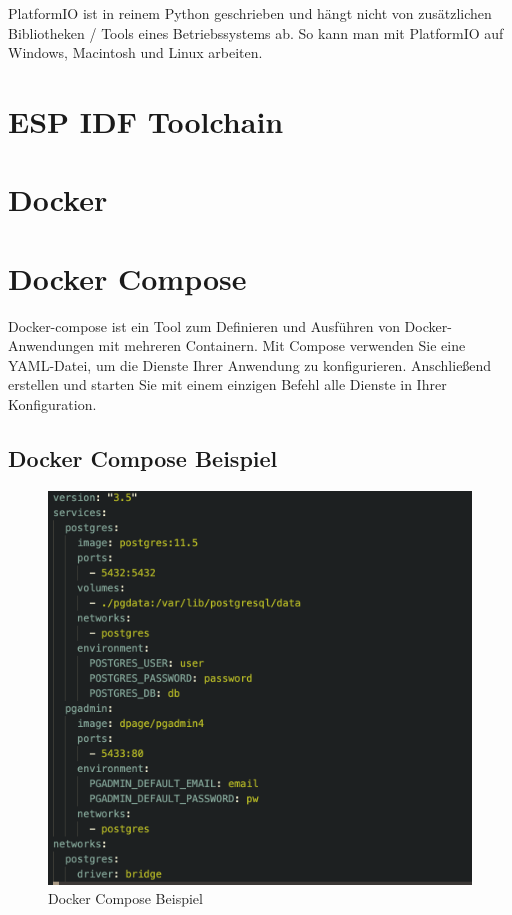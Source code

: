 PlatformIO ist in reinem Python geschrieben und hängt nicht von zusätzlichen Bibliotheken / Tools eines Betriebssystems ab. So kann man mit PlatformIO auf Windows, Macintosh und Linux arbeiten.

\section{ESP IDF Toolchain}\label{sec:platformio}

\section{Docker}\label{sec:docker}

\section{Docker Compose}\label{sec:docker-compose}

Docker-compose ist ein Tool zum Definieren und Ausführen von Docker-Anwendungen mit mehreren Containern. Mit Compose verwenden Sie eine YAML-Datei, um die Dienste Ihrer Anwendung zu konfigurieren. Anschließend erstellen und starten Sie mit einem einzigen Befehl alle Dienste in Ihrer Konfiguration. \cite{docker_compose_description}

\subsection{Docker Compose Beispiel}

\begin{figure}[H]
    \begin{center}
        \includegraphics[scale=0.8]{images/docker_compose_example.png}
        \caption{Docker Compose Beispiel}
    \end{center}
\end{figure}

